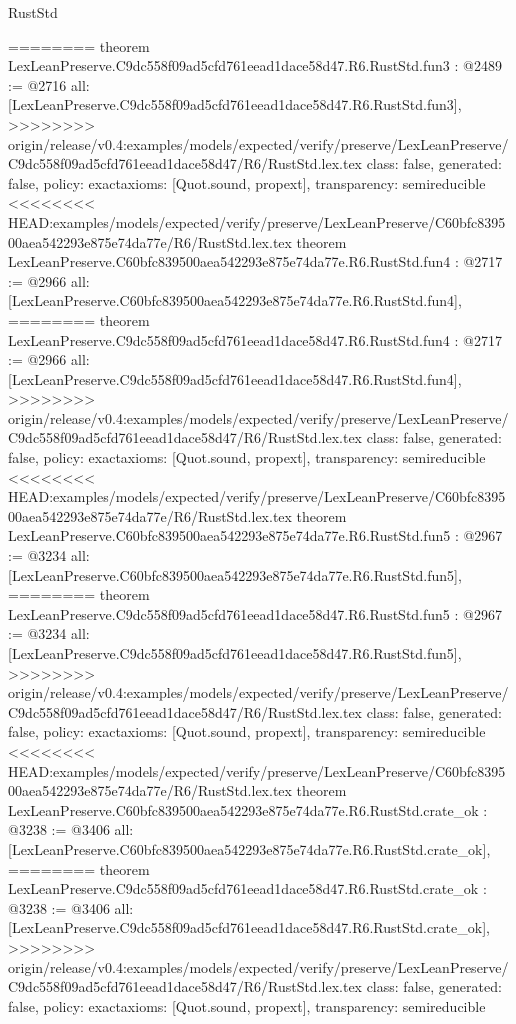 \begin{lexlean}{RustStd}
\begin{coremodule}
{\begin{coremodule}
{{{{{{========
theorem LexLeanPreserve.C9dc558f09ad5cfd761eead1dace58d47.R6.RustStd.fun3 : @2489 := @2716 {
  all: [LexLeanPreserve.C9dc558f09ad5cfd761eead1dace58d47.R6.RustStd.fun3],
>>>>>>>> origin/release/v0.4:examples/models/expected/verify/preserve/LexLeanPreserve/C9dc558f09ad5cfd761eead1dace58d47/R6/RustStd.lex.tex
  class: false,
  generated: false,
  policy: exact{axioms: [Quot.sound, propext]},
  transparency: semireducible
}
<<<<<<<< HEAD:examples/models/expected/verify/preserve/LexLeanPreserve/C60bfc839500aea542293e875e74da77e/R6/RustStd.lex.tex
theorem LexLeanPreserve.C60bfc839500aea542293e875e74da77e.R6.RustStd.fun4 : @2717 := @2966 {
  all: [LexLeanPreserve.C60bfc839500aea542293e875e74da77e.R6.RustStd.fun4],
========
theorem LexLeanPreserve.C9dc558f09ad5cfd761eead1dace58d47.R6.RustStd.fun4 : @2717 := @2966 {
  all: [LexLeanPreserve.C9dc558f09ad5cfd761eead1dace58d47.R6.RustStd.fun4],
>>>>>>>> origin/release/v0.4:examples/models/expected/verify/preserve/LexLeanPreserve/C9dc558f09ad5cfd761eead1dace58d47/R6/RustStd.lex.tex
  class: false,
  generated: false,
  policy: exact{axioms: [Quot.sound, propext]},
  transparency: semireducible
}
<<<<<<<< HEAD:examples/models/expected/verify/preserve/LexLeanPreserve/C60bfc839500aea542293e875e74da77e/R6/RustStd.lex.tex
theorem LexLeanPreserve.C60bfc839500aea542293e875e74da77e.R6.RustStd.fun5 : @2967 := @3234 {
  all: [LexLeanPreserve.C60bfc839500aea542293e875e74da77e.R6.RustStd.fun5],
========
theorem LexLeanPreserve.C9dc558f09ad5cfd761eead1dace58d47.R6.RustStd.fun5 : @2967 := @3234 {
  all: [LexLeanPreserve.C9dc558f09ad5cfd761eead1dace58d47.R6.RustStd.fun5],
>>>>>>>> origin/release/v0.4:examples/models/expected/verify/preserve/LexLeanPreserve/C9dc558f09ad5cfd761eead1dace58d47/R6/RustStd.lex.tex
  class: false,
  generated: false,
  policy: exact{axioms: [Quot.sound, propext]},
  transparency: semireducible
}
<<<<<<<< HEAD:examples/models/expected/verify/preserve/LexLeanPreserve/C60bfc839500aea542293e875e74da77e/R6/RustStd.lex.tex
theorem LexLeanPreserve.C60bfc839500aea542293e875e74da77e.R6.RustStd.crate_ok : @3238 := @3406 {
  all: [LexLeanPreserve.C60bfc839500aea542293e875e74da77e.R6.RustStd.crate_ok],
========
theorem LexLeanPreserve.C9dc558f09ad5cfd761eead1dace58d47.R6.RustStd.crate_ok : @3238 := @3406 {
  all: [LexLeanPreserve.C9dc558f09ad5cfd761eead1dace58d47.R6.RustStd.crate_ok],
>>>>>>>> origin/release/v0.4:examples/models/expected/verify/preserve/LexLeanPreserve/C9dc558f09ad5cfd761eead1dace58d47/R6/RustStd.lex.tex
  class: false,
  generated: false,
  policy: exact{axioms: [Quot.sound, propext]},
  transparency: semireducible
}}}}}}}}}}
\end{coremodule}}
\end{coremodule}
\end{lexlean}
